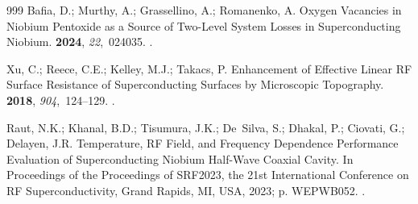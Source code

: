 \documentclass[
  aps,
  physrev,
  reprint,
  superscriptaddress,
  nofootinbib,
  amsmath,
  amssymb
]{revtex4-2}
\begin{document}
\begin{thebibliography}{999}
Bafia, D.; Murthy, A.; Grassellino, A.; Romanenko, A.
\newblock Oxygen Vacancies in Niobium Pentoxide as a Source of Two-Level System
  Losses in Superconducting Niobium.
 {\bf 2024}, {\em 22},~024035.
.

Xu, C.; Reece, C.E.; Kelley, M.J.; Takacs, P.
\newblock Enhancement of Effective Linear {RF} Surface Resistance of
  Superconducting Surfaces by Microscopic Topography.
  {\bf 2018}, {\em 904},~124--129.
.

Raut, N.K.; Khanal, B.D.; Tisumura, J.K.; De~Silva, S.; Dhakal, P.; Ciovati,
  G.; Delayen, J.R.
\newblock Temperature, {RF} Field, and Frequency Dependence Performance
  Evaluation of Superconducting Niobium Half-Wave Coaxial Cavity.
\newblock In Proceedings of the Proceedings of {SRF2023}, the 21st
  International Conference on {RF} Superconductivity, Grand Rapids, MI, USA,
  2023; p. WEPWB052.
.

\end{thebibliography}



\end{document}
